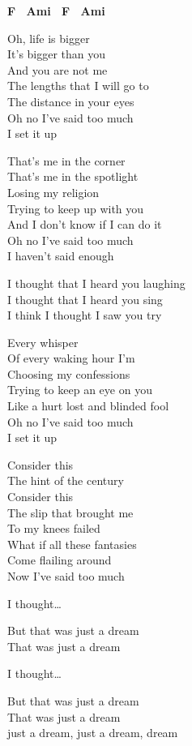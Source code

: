 
\re{}
\textbf{{\footnotesize F \ Ami \ F \ Ami}}

\ve{}
Oh, life is bigger\\
It's bigger than you\\
And you are not me\\
The lengths that I will go to\\
The distance in your eyes\\
Oh no I've said too much\\
I set it up

\cho{}
That's me in the corner\\
That's me in the spotlight\\
Losing my religion\\
Trying to keep up with you\\
And I don't know if I can do it\\
Oh no I've said too much\\
I haven't said enough

\re{*:}
I thought that I heard you laughing\\
I thought that I heard you sing\\
I think I thought I saw you try

\ve{}
Every whisper\\
Of every waking hour I'm\\
Choosing my confessions\\
Trying to keep an eye on you\\
Like a hurt lost and blinded fool\\
Oh no I've said too much\\
I set it up

\ve{}
Consider this\\
The hint of the century\\
Consider this\\
The slip that brought me\\
To my knees failed\\
What if all these fantasies\\
Come flailing around\\
Now I've said too much

\re{*:}
I thought\ldots{}

\re{}
But that was just a dream\\
That was just a dream

\cho{}

\re{*:}
I thought\ldots{}

\re{}
But that was just a dream\\
That was just a dream\\
just a dream, just a dream, dream

\esong{}